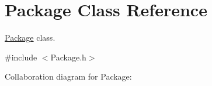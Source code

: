 \hypertarget{classPackage}{}\section{Package Class Reference}
\label{classPackage}


\hyperlink{classPackage}{Package} class.  




{\ttfamily \#include $<$Package.\+h$>$}



Collaboration diagram for Package\+:
